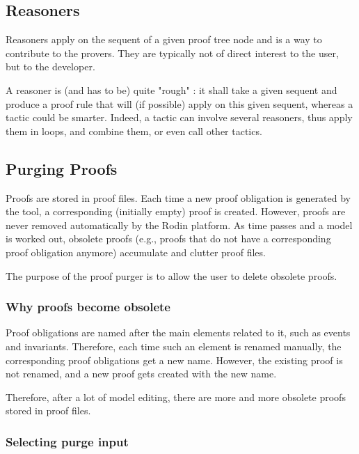 \subsection{Reasoners}
\label{ref:reasoners}

Reasoners apply on the sequent of a given proof tree node and is a way to contribute to the provers.  They are typically not of direct interest to the user, but to the developer.

A reasoner is (and has to be) quite "rough" : it shall take a given sequent and produce a proof rule that will (if possible) apply on this given sequent, whereas a tactic could be smarter. Indeed, a tactic can involve several reasoners, thus apply them in loops, and combine them, or even call other tactics.

\subsection{Purging Proofs}

Proofs are stored in proof files. Each time a new proof obligation is generated by the tool, a corresponding (initially empty) proof is created. However, proofs are never removed automatically by the Rodin platform. As time passes and a model is worked out, obsolete proofs (e.g., proofs that do not have a corresponding proof obligation anymore) accumulate and clutter proof files.

The purpose of the proof purger is to allow the user to delete obsolete proofs. 

\subsubsection{Why proofs become obsolete}

Proof obligations are named after the main elements related to it, such as events and invariants. Therefore, each time such an element is renamed manually, the corresponding proof obligations get a new name. However, the existing proof is not renamed, and a new proof gets created with the new name.

Therefore, after a lot of model editing, there are more and more obsolete proofs stored in proof files.

\subsubsection{Selecting purge input}

